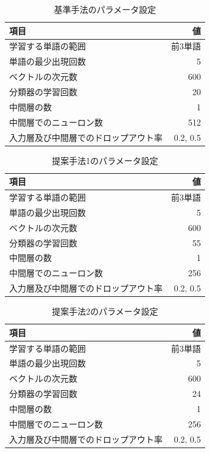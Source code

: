 \documentclass[twocolumn,a4paper]{ltjarticle}
\begin{document}
\begin{table}
  \caption{基準手法のパラメータ設定}
  \begin{tabular}{l | r}\label{tab:ParametersOfBaselineMethod}
    項目 & 値 \\
    \hline
    学習する単語の範囲 & 前3単語 \\
    単語の最少出現回数 & 5 \\
    ベクトルの次元数 & 600 \\
    分類器の学習回数 & 20 \\
    中間層の数 & 1 \\
    中間層でのニューロン数 & 512 \\
    入力層及び中間層でのドロップアウト率 & 0.2, 0.5 \\
  \end{tabular}
\end{table}

\begin{table}
  \caption{提案手法1のパラメータ設定}
  \begin{tabular}{l | r}\label{tab:ParametersOfMyMethod1}
    項目 & 値 \\
    \hline
    学習する単語の範囲 & 前3単語 \\
    単語の最少出現回数 & 5 \\
    ベクトルの次元数 & 600 \\
    分類器の学習回数 & 55 \\
    中間層の数 & 1 \\
    中間層でのニューロン数 & 256 \\
    入力層及び中間層でのドロップアウト率 & 0.2, 0.5 \\
  \end{tabular}
\end{table}

\begin{table}
  \caption{提案手法2のパラメータ設定}
  \begin{tabular}{l | r}\label{tab:ParametersOfMyMethod2}
    項目 & 値 \\
    \hline
    学習する単語の範囲 & 前3単語 \\
    単語の最少出現回数 & 5 \\
    ベクトルの次元数 & 600 \\
    分類器の学習回数 & 24 \\
    中間層の数 & 1 \\
    中間層でのニューロン数 & 256 \\
    入力層及び中間層でのドロップアウト率 & 0.2, 0.5 \\
  \end{tabular}
\end{table}
\end{document}
